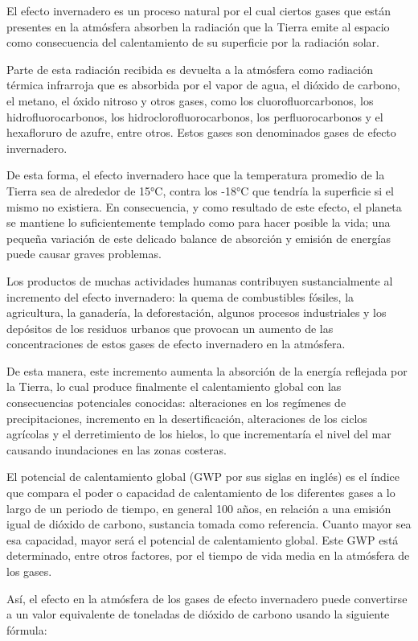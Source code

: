 	El efecto invernadero es un proceso natural por el cual ciertos gases que están presentes en la atmósfera absorben la radiación que la Tierra emite al espacio como consecuencia del calentamiento de su superficie por la radiación solar.

	Parte de esta radiación recibida es devuelta a la atmósfera como radiación térmica infrarroja que es absorbida por el vapor de agua, el dióxido de carbono, el metano, el óxido nitroso y otros gases, como los cluorofluorcarbonos, los hidrofluorocarbonos, los hidroclorofluorocarbonos, los perfluorocarbonos y el hexafloruro de azufre, entre otros. Estos gases son denominados gases de efecto invernadero.

	De esta forma, el efecto invernadero hace que la temperatura promedio de la Tierra sea de alrededor de 15°C, contra los -18°C que tendría la superficie si el mismo no existiera. En consecuencia, y como resultado de este efecto, el planeta se mantiene lo suficientemente templado como para hacer posible la vida; una pequeña variación de este delicado balance de absorción y emisión de energías puede causar graves problemas.

	Los productos de muchas actividades humanas contribuyen sustancialmente al incremento del efecto invernadero: la quema de combustibles fósiles, la agricultura, la ganadería, la deforestación, algunos procesos industriales y los depósitos de los residuos urbanos que provocan un aumento de las concentraciones de estos gases de efecto invernadero en la atmósfera.

	De esta manera, este incremento aumenta la absorción de la energía reflejada por la Tierra, lo cual produce finalmente el calentamiento global con las consecuencias potenciales conocidas: alteraciones en los regímenes de precipitaciones, incremento en la desertificación, alteraciones de los ciclos agrícolas y el derretimiento de los hielos, lo que incrementaría el nivel del mar causando inundaciones en las zonas costeras.

	El potencial de calentamiento global (GWP por sus siglas en inglés) es el índice que compara el poder o capacidad de calentamiento de los diferentes gases a lo largo de un periodo de tiempo, en general 100 años, en relación a una emisión igual de dióxido de carbono, sustancia tomada como referencia. Cuanto mayor sea esa capacidad, mayor será el potencial de calentamiento global. Este GWP está determinado, entre otros factores, por el tiempo de vida media en la atmósfera de los gases.

	Así, el efecto en la atmósfera de los gases de efecto invernadero puede convertirse a un valor equivalente de toneladas de dióxido de carbono usando la siguiente fórmula:


